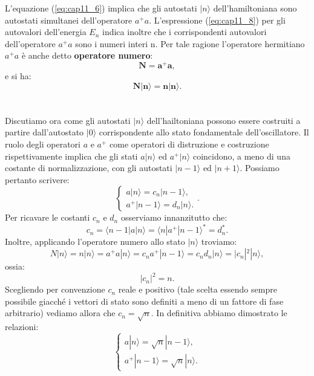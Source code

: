  L'equazione (\ref{eq:cap11_6}) implica che gli autostati $|n\rangle$ dell'hamiltoniana sono autostati simultanei dell'operatore $a^+a$. L'espressione (\ref{eq:cap11_8}) per gli autovalori dell'energia $E_n$ indica inoltre che i corrispondenti autovalori dell'operatore $a^+a$ sono i numeri interi n. Per tale ragione l'operatore hermitiano $a^+a$ è anche detto \textbf{operatore numero}:
\begin{equation}
\mathbf{N=a^+a},
\end{equation}
e si ha:
\begin{equation}
\mathbf{N|n\rangle=n|n\rangle}.
\end{equation}
\\\\
 Discutiamo ora come gli autostati $|n\rangle$ dell'hailtoniana possono essere costruiti a partire dall'autostato $|0\rangle$ corrispondente allo stato fondamentale dell'oscillatore.
 Il ruolo degli operatori $a$ e $a^+$ come operatori di distruzione e costruzione rispettivamente implica che gli stati $a|n\rangle$ ed $a^+|n\rangle$ coincidono, a meno di una costante di normalizzazione, con gli autostati $|n-1\rangle$ ed $|n+1\rangle$. Possiamo pertanto scrivere:
\begin{equation}
\begin{cases}
a|n\rangle=c_n|n-1\rangle,\\
a^+|n-1\rangle=d_n|n\rangle.
\end{cases}.
\end{equation}
 Per ricavare le costanti $c_n$ e $d_n$ osserviamo innanzitutto che:
\begin{equation}
c_n=\langle n-1|a|n\rangle=\langle n|a^+|n-1\rangle^*=d_n^*.
\end{equation}
 Inoltre, applicando l'operatore numero allo stato $|n\rangle$ troviamo:
\begin{equation}
N|n\rangle=n|n\rangle=a^+a|n\rangle=c_na^+|n-1\rangle=c_nd_n|n\rangle=|c_n|^2|n\rangle,
\end{equation}
ossia:
\begin{equation}
|c_n|^2=n.
\end{equation}
Scegliendo per convenzione $c_n$ reale e positivo (tale scelta essendo sempre possibile giacché i vettori di stato sono definiti a meno di un fattore di fase arbitrario) vediamo allora che $c_n=\sqrt{n}$. In definitiva abbiamo dimostrato le relazioni:
\begin{equation} \label{eq:cap11_9}
\begin{cases}
a|n\rangle= \sqrt{n} |n-1\rangle, \\
a^+|n-1\rangle=\sqrt{n}|n\rangle.
\end{cases}
\end{equation}
